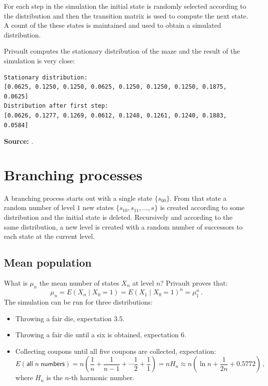 \documentclass[11pt,a4paper]{article}
\begin{document}
For each step in the simulation the initial state is randomly selected according to the distribution and then the transition matrix is used to compute the next state. A count of the these states is maintained and used to obtain a simulated distribution.

Privault computes the stationary distribution of the maze and the result of the simulation is very close:
\begin{verbatim}
Stationary distribution:
[0.0625, 0.1250, 0.1250, 0.0625, 0.1250, 0.1250, 0.1250, 0.1875, 0.0625]
Distribution after first step:
[0.0626, 0.1277, 0.1269, 0.0612, 0.1248, 0.1261, 0.1240, 0.1883, 0.0584]\end{verbatim}

\textbf{Source:} \cite[Section 7.2]{privault}.


\section{Branching processes}\label{branching}

A branching process starts out with a single state $\{s_{00}\}$. From that state a random number of level $1$ new states $\{s_{10}, s_{11}, \ldots, s_{}\}$ is created according to some distribution and the initial state is deleted. Recursively and according to the same distribution, a new level is created with a random number of successors to each state at the current level.

\subsection{Mean population}

What is $\mu_n$ the mean number of states $X_n$ at level $n$?
Privault proves that:
\[
\mu_n = E(X_n \mid X_0=1) = E(X_1 \mid X_0=1)^n = \mu_1^n\,.
\]
The simulation can be run for three distributions:
\begin{itemize}
\item Throwing a fair die, expectation $3.5$.
\item Throwing a fair die until a six is obtained, expectation $6$.
\item Collecting coupons until all five coupons are collected, expectation:
\[
E(\textsf{all}\;n \;\textsf{numbers}) = n\left(\frac{1}{n}+\frac{1}{n-1} + \cdots \frac{1}{2} + \frac{1}{1}\right) =nH_n\approx n\left(\ln n + \frac{1}{2n} + 0.5772\right)\,,
\]
where $H_n$ is the $n$-th harmonic number.
\end{itemize}
\end{document}
